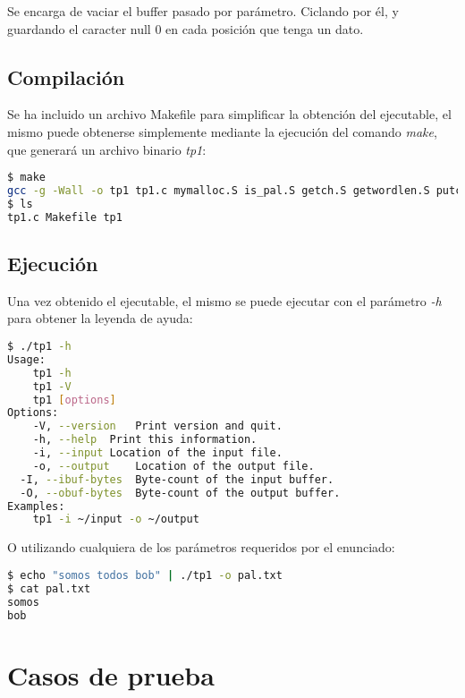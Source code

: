 \documentclass[10pt,a4paper]{article}
\begin{document}
Se encarga de vaciar el buffer pasado por parámetro. Ciclando por él, y guardando el caracter null 0 en cada posición que tenga un dato.


\subsection{Compilación}

\lstset{
	breaklines=true,
  	basicstyle=\footnotesize,
}

Se ha incluido un archivo Makefile para simplificar la obtención del ejecutable, el mismo puede obtenerse simplemente mediante la ejecución del comando \textit{make}, que generará un archivo binario \textit{tp1}:

\begin{lstlisting}[language=bash]
$ make
gcc -g -Wall -o tp1 tp1.c mymalloc.S is_pal.S getch.S getwordlen.S putch.S palindrome.S strcopy.S clear_buf.S
$ ls
tp1.c Makefile tp1 
\end{lstlisting}

\subsection{Ejecución}

Una vez obtenido el ejecutable, el mismo se puede ejecutar con el parámetro \textit{-h} para obtener la leyenda de ayuda:

\begin{lstlisting}[language=bash]
$ ./tp1 -h
Usage:
	tp1 -h
	tp1 -V
	tp1 [options]
Options:
	-V, --version	Print version and quit.
	-h, --help	Print this information.
	-i, --input	Location of the input file.
	-o, --output	Location of the output file.
  -I, --ibuf-bytes  Byte-count of the input buffer.
  -O, --obuf-bytes  Byte-count of the output buffer.
Examples:
	tp1 -i ~/input -o ~/output

\end{lstlisting}

O utilizando cualquiera de los parámetros requeridos por el enunciado:

\begin{lstlisting}[language=bash]
$ echo "somos todos bob" | ./tp1 -o pal.txt
$ cat pal.txt
somos
bob
\end{lstlisting}

\newpage

\section{Casos de prueba}
\end{document}
